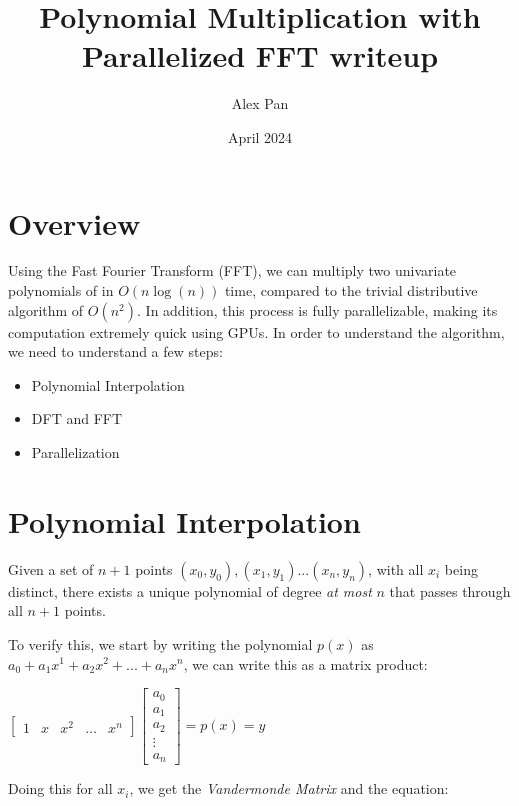 \documentclass{article}
\title{Polynomial Multiplication with Parallelized FFT writeup}
\author{Alex Pan}
\date{April 2024}
\begin{document}
\maketitle

\section{Overview}
Using the Fast Fourier Transform (FFT), we can multiply two univariate polynomials of in $O(n\log(n))$ time, compared to the trivial distributive algorithm of $O(n^2)$. In addition, this process is fully parallelizable, making its computation extremely quick using GPUs. In order to understand the algorithm, we need to understand a few steps:

\begin{itemize}
    \item Polynomial Interpolation 
    \item DFT and FFT
    \item Parallelization
\end{itemize}

\section{Polynomial Interpolation}
Given a set of $n+1$ points $(x_0,y_0), (x_1,y_1) ... (x_n, y_n)$, with all $x_i$ being distinct, there exists a unique polynomial of degree \textit{at most} $n$ that passes through all $n+1$ points.

To verify this, we start by writing the polynomial $p(x)$ as $a_0 + a_1x^1 + a_2x^2 + ... + a_nx^n$, we can write this as a matrix product:

\centerline{$\begin{bmatrix} 1 & x & x^2 & \ldots & x^n \end{bmatrix}\begin{bmatrix} a_0 \\ a_1 \\ a_2 \\ \vdots \\ a_n \end{bmatrix} = p(x) = y$}

Doing this for all $x_i$, we get the \textit{Vandermonde Matrix} and the equation:
\end{document}
